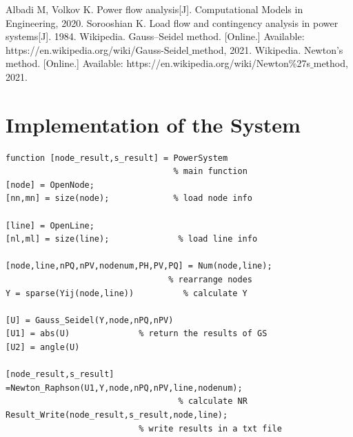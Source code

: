 \documentclass[conference]{IEEEtran}
\begin{document}
%

\newpage
\begin{thebibliography}{00}
 Albadi M, Volkov K. Power flow analysis[J]. Computational Models in Engineering, 2020.
 Sorooshian K. Load flow and contingency analysis in power systems[J]. 1984.
 Wikipedia. Gauss–Seidel method. [Online.] Available: https://en.wikipedia.org/wiki/Gauss-Seidel$\_$method, 2021.
 Wikipedia. Newton's method. [Online.] Available: https://en.wikipedia.org/wiki/Newton$\%$27s$\_$method, 2021.
\end{thebibliography}

\appendices
\section{Implementation of the System}
\begin{lstlisting}
function [node_result,s_result] = PowerSystem
                                  % main function
[node] = OpenNode; 
[nn,mn] = size(node);             % load node info

[line] = OpenLine;
[nl,ml] = size(line);              % load line info

[node,line,nPQ,nPV,nodenum,PH,PV,PQ] = Num(node,line);
                                 % rearrange nodes
Y = sparse(Yij(node,line))          % calculate Y

[U] = Gauss_Seidel(Y,node,nPQ,nPV)
[U1] = abs(U)              % return the results of GS
[U2] = angle(U)

[node_result,s_result] =Newton_Raphson(U1,Y,node,nPQ,nPV,line,nodenum);
                                   % calculate NR
Result_Write(node_result,s_result,node,line);
                           % write results in a txt file
\end{lstlisting}
\end{document}
